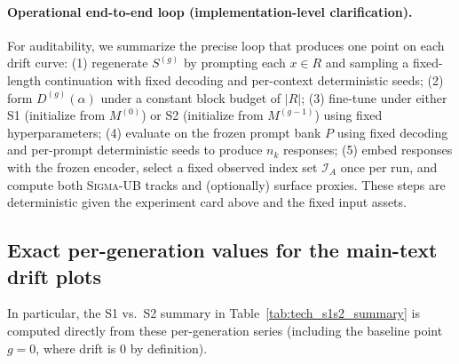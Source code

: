 \documentclass{article}
\theoremstyle{plain}
\theoremstyle{definition}
\theoremstyle{remark}
\newcommand{\sgma}{\textsc{Sigma}\xspace}
\begin{document}
\paragraph{Operational end-to-end loop (implementation-level clarification).}
For auditability, we summarize the precise loop that produces one point on each drift curve:
(1) regenerate $S^{(g)}$ by prompting each $x\in R$ and sampling a fixed-length continuation with fixed decoding and per-context deterministic seeds;
(2) form $D^{(g)}(\alpha)$ under a constant block budget of $|R|$;
(3) fine-tune under either S1 (initialize from $M^{(0)}$) or S2 (initialize from $M^{(g-1)}$) using fixed hyperparameters;
(4) evaluate on the frozen prompt bank $P$ using fixed decoding and per-prompt deterministic seeds to produce $n_k$ responses;
(5) embed responses with the frozen encoder, select a fixed observed index set $\mathcal{I}_A$ once per run, and compute both \sgma-UB tracks and (optionally) surface proxies.
These steps are deterministic given the experiment card above and the fixed input assets.

\subsection{Exact per-generation values for the main-text drift plots}
\label{app:plot_tables_tech}

In particular, the S1 vs.\ S2 summary in Table~\ref{tab:tech_s1s2_summary} is computed directly from these per-generation series (including the baseline point $g=0$, where drift is $0$ by definition).
\end{document}

